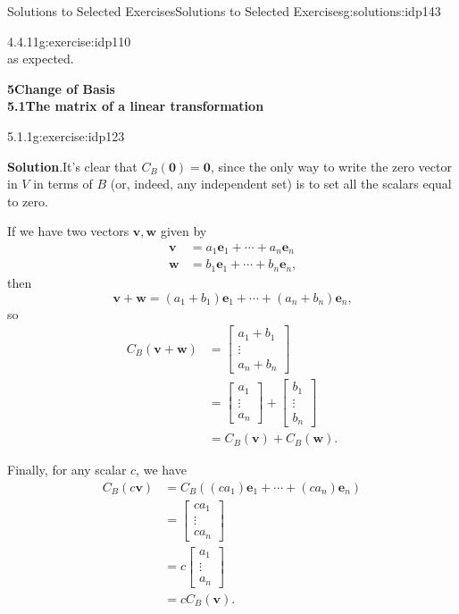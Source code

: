 \documentclass[oneside,10pt,]{book}
\newcommand{\blocktitlefont}{\relax}
\numberwithin{equation}{section}
\newcommand{\bbm}{\begin{bmatrix}}
\newcommand{\ebm}{\end{bmatrix}}
\newcommand{\vv}{\mathbf{v}}
\newcommand{\ww}{\mathbf{w}}
\newcommand{\amp}{&}
\begin{document}
\begin{solutions-chapter}{Solutions to Selected Exercises}{}{Solutions to Selected Exercises}{}{}{g:solutions:idp143}
\begin{inlinesolution}{4.4.11}{}{g:exercise:idp110}
\begin{equation*}
\end{equation*}
as expected.%
\end{inlinesolution}%
\par\medskip
\noindent\textbf{\Large{}5\space\textperiodcentered\space{}Change of Basis\\
5.1\space\textperiodcentered\space{}The matrix of a linear transformation}
\begin{inlinesolution}{5.1.1}{}{g:exercise:idp123}%
\par\smallskip%
\noindent\textbf{\blocktitlefont Solution}.\hypertarget{g:solution:idp175-back}{}\quad{}It's clear that \(C_B(\mathbf{0})=\mathbf{0}\), since the only way to write the zero vector in \(V\) in terms of \(B\) (or, indeed, any independent set) is to set all the scalars equal to zero.%
\par
If we have two vectors \(\vv,\ww\) given by%
\begin{align*}
\vv \amp = a_1\mathbf{e}_1+\cdots + a_n\mathbf{e}_n \\
\ww \amp = b_1\mathbf{e}_1+\cdots + b_n\mathbf{e}_n\text{,}
\end{align*}
then%
\begin{equation*}
\vv+\ww = (a_1+b_1)\mathbf{e}_1+\cdots + (a_n+b_n)\mathbf{e}_n\text{,}
\end{equation*}
so%
\begin{align*}
C_B(\vv+\ww) \amp = \bbm a_1+b_1\\\vdots \\ a_n+b_n\ebm \\
\amp = \bbm a_1\\\vdots\\a_n\ebm +\bbm b_1\\\vdots \\b_n\ebm\\
\amp = C_B(\vv)+C_B(\ww)\text{.}
\end{align*}
%
\par
Finally, for any scalar \(c\), we have%
\begin{align*}
C_B(c\vv) \amp = C_B((ca_1)\mathbf{e}_1+\cdots +(ca_n)\mathbf{e}_n)\\
\amp = \bbm ca_1\\\vdots \\ca_n\ebm\\
\amp =c\bbm a_1\\\vdots \\a_n\ebm\\
\amp =cC_B(\vv)\text{.}
\end{align*}
%
\par

\end{inlinesolution}
\end{solutions-chapter}
\end{document}
